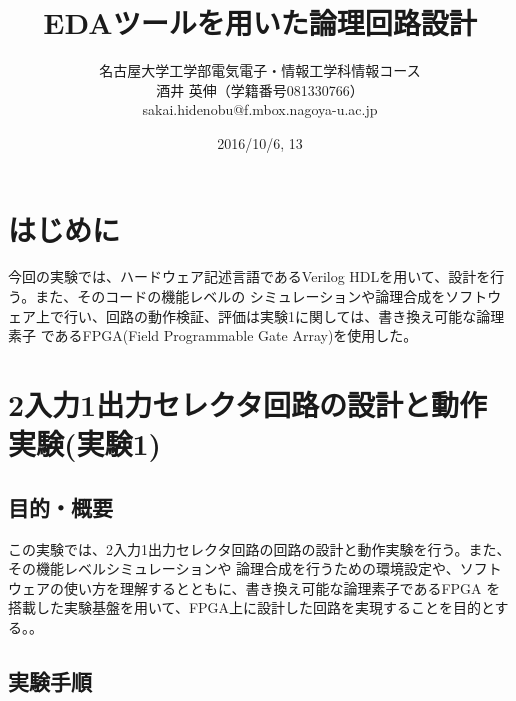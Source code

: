 \documentclass[uplatex]{jsarticle}
\begin{document}
\title{EDAツールを用いた論理回路設計}
\author{名古屋大学工学部電気電子・情報工学科情報コース\\酒井 英伸（学籍番号081330766）\\sakai.hidenobu@f.mbox.nagoya-u.ac.jp}
\date{2016/10/6, 13}
\maketitle

\tableofcontents


\clearpage
\section{はじめに}

今回の実験では、ハードウェア記述言語であるVerilog HDLを用いて、設計を行う。また、そのコードの機能レベルの
シミュレーションや論理合成をソフトウェア上で行い、回路の動作検証、評価は実験1に関しては、書き換え可能な論理素子
であるFPGA(Field Programmable Gate Array)を使用した。

\section{2入力1出力セレクタ回路の設計と動作実験(実験1)}

\subsection{目的・概要}

この実験では、2入力1出力セレクタ回路の回路の設計と動作実験を行う。また、その機能レベルシミュレーションや
論理合成を行うための環境設定や、ソフトウェアの使い方を理解するとともに、書き換え可能な論理素子であるFPGA
を搭載した実験基盤を用いて、FPGA上に設計した回路を実現することを目的とする。。

\subsection{実験手順}
\end{document}

